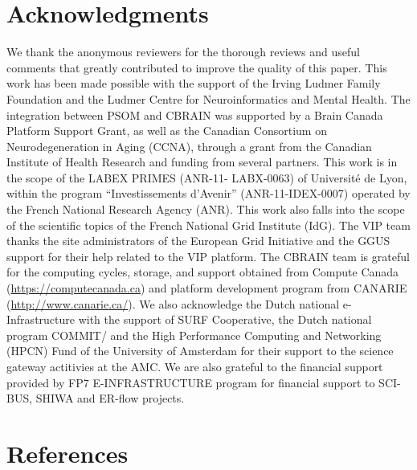 \documentclass[preprint,3p,twocolumn]{elsarticle}
\newcommand{\correction}[1]{\color{blue}#1\color{black}\xspace}
\begin{document}

\section{Acknowledgments}

\correction{We thank the anonymous reviewers for the thorough reviews and useful comments that greatly contributed to improve the quality of this paper.} This work has been made possible with the support of the Irving Ludmer
Family Foundation and the Ludmer Centre for Neuroinformatics and
Mental Health. The integration between PSOM and CBRAIN was supported
by a Brain Canada Platform Support Grant, as well as the Canadian
Consortium on Neurodegeneration in Aging (CCNA), through a grant from
the Canadian Institute of Health Research and funding from several
partners.  This work is in the scope of the LABEX PRIMES (ANR-11-
LABX-0063) of Universit\'e de Lyon, within the program
``Investissements d'Avenir'' (ANR-11-IDEX-0007) operated by the French
National Research Agency (ANR). This work also falls into the scope of
the scientific topics of the French National Grid Institute (IdG). The
VIP team thanks the site administrators of the European Grid
Initiative and the GGUS support for their help related to the VIP
platform. The CBRAIN team is grateful for the computing cycles,
storage, and support obtained from Compute Canada
(\url{https://computecanada.ca}) and platform development program from
CANARIE (\url{http://www.canarie.ca/}). We also acknowledge the Dutch
national e-Infrastructure with the support of SURF Cooperative, the
Dutch national program COMMIT/ and the High Performance Computing and
Networking (HPCN) Fund of the University of Amsterdam for their
support to the science gateway actitivies at the AMC.  We are also
grateful to the financial support provided by FP7 E-INFRASTRUCTURE
program for financial support to SCI-BUS, SHIWA and ER-flow
projects. 

\section*{References}

\enlargethispage{5mm}


\end{document}
